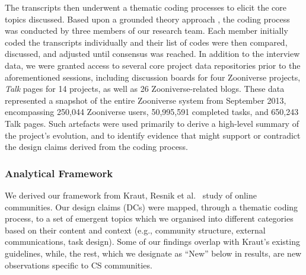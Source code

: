 \documentclass{sigchi}
\begin{document}
\begin{spacing}{0.97}
The transcripts then underwent a thematic coding processes to elicit the core topics discussed. Based upon a grounded theory approach \cite{mazzolini2003sage}, the coding process was conducted by three members of our research team. Each member initially coded the transcripts individually and their list of codes were then compared, discussed, and adjusted until consensus was reached. In addition to the interview data, we were granted access to several core project data repositories prior to the aforementioned sessions, including discussion boards for four Zooniverse projects, \emph{Talk} pages for 14 projects, as well as 26 Zooniverse-related blogs. These data represented a snapshot of the entire Zooniverse system from September 2013, encompassing 250,044 Zooniverse users, 50,995,591 completed tasks, and 650,243 Talk pages. Such artefacts were used primarily to derive a high-level summary of the project's evolution, and to identify evidence that might support or contradict the design claims derived from the coding process. %


\subsubsection{Analytical Framework}

We derived our framework from Kraut, Resnik et al.~\cite{kraut2012building} study of online communities. Our design claims (DCs) were mapped, through a thematic coding process, to a set of emergent topics which we organised into different categories based on their content and context (e.g., community structure, external communications, task design). Some of our findings overlap with Kraut's existing guidelines, while, the rest, which we designate as ``New'' below in results, are new observations specific to CS communities. 




\end{spacing}
\end{document}
